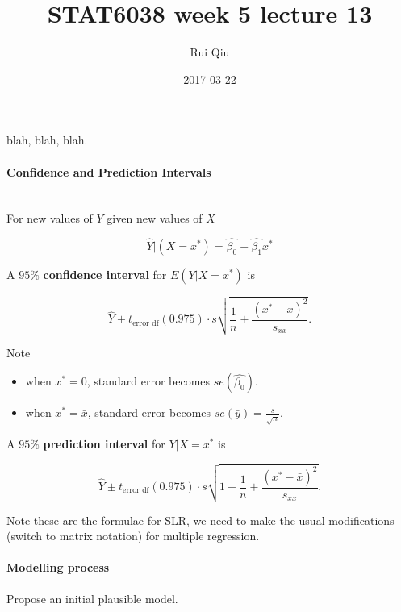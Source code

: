 \documentclass[a4paper, 11pt, twoside]{article}
\begin{document}
\title{STAT6038 week 5 lecture 13}
\author{Rui Qiu}
\date{2017-03-22}

\maketitle

blah, blah, blah.

\paragraph{Confidence and Prediction Intervals}\ \\

For new values of $Y$ given new values of $X$

\[\hat{Y}|(X=x^*) = \hat{\beta_0} +\hat{\beta_1}x^*\]

A $95\%$ \textbf{confidence interval} for $E(Y|X=x^*)$ is

\[\hat{Y}\pm t_{\text{error df}}(0.975)\cdot s\sqrt{\frac1n + \frac{(x^*-\bar{x})^2}{s_{xx}}}.\]

Note 

\begin{itemize}
	\item when $x^*=0$, standard error becomes $se(\hat{\beta_0}).$
	\item when $x^*=\bar{x}$, standard error becomes $se(\bar{y})=\frac{s}{\sqrt{n}}.$\\
\end{itemize}

A $95\%$ \textbf{prediction interval} for $Y|X = x^*$ is

\[\hat{Y}\pm t_{\text{error df}}(0.975) \cdot s\sqrt{1+\frac{1}{n}+\frac{(x^*-\bar{x})^2}{s_{xx}}}.\]

Note these are the formulae for SLR, we need to make the usual modifications (switch to matrix notation) for multiple regression.\\

\paragraph{Modelling process} Propose an initial plausible model.
\end{document}
